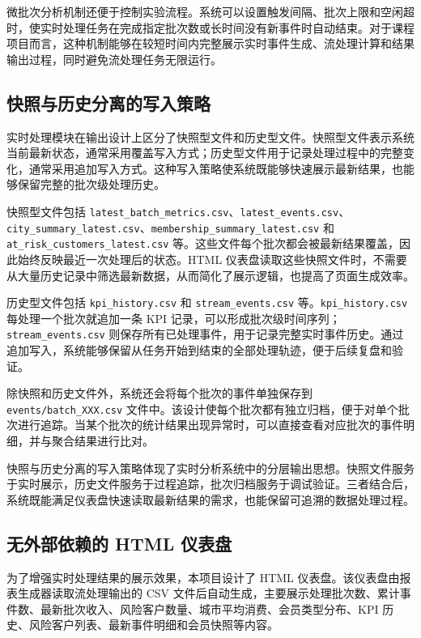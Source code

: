 \documentclass[12pt,hyperref,a4paper,UTF8]{ctexart}
\begin{document}
微批次分析机制还便于控制实验流程。系统可以设置触发间隔、批次上限和空闲超时，使实时处理任务在完成指定批次数或长时间没有新事件时自动结束。对于课程项目而言，这种机制能够在较短时间内完整展示实时事件生成、流处理计算和结果输出过程，同时避免流处理任务无限运行。

\subsection{快照与历史分离的写入策略}

实时处理模块在输出设计上区分了快照型文件和历史型文件。快照型文件表示系统当前最新状态，通常采用覆盖写入方式；历史型文件用于记录处理过程中的完整变化，通常采用追加写入方式。这种写入策略使系统既能够快速展示最新结果，也能够保留完整的批次级处理历史。

快照型文件包括 \texttt{latest\_batch\_metrics.csv}、\texttt{latest\_events.csv}、\texttt{city\_summary\_latest.csv}、\texttt{membership\_summary\_latest.csv} 和 \texttt{at\_risk\_customers\_latest.csv} 等。这些文件每个批次都会被最新结果覆盖，因此始终反映最近一次处理后的状态。HTML 仪表盘读取这些快照文件时，不需要从大量历史记录中筛选最新数据，从而简化了展示逻辑，也提高了页面生成效率。

历史型文件包括 \texttt{kpi\_history.csv} 和 \texttt{stream\_events.csv} 等。\texttt{kpi\_history.csv} 每处理一个批次就追加一条 KPI 记录，可以形成批次级时间序列；\texttt{stream\_events.csv} 则保存所有已处理事件，用于记录完整实时事件历史。通过追加写入，系统能够保留从任务开始到结束的全部处理轨迹，便于后续复盘和验证。

除快照和历史文件外，系统还会将每个批次的事件单独保存到 \texttt{events/batch\_XXX.csv} 文件中。该设计使每个批次都有独立归档，便于对单个批次进行追踪。当某个批次的统计结果出现异常时，可以直接查看对应批次的事件明细，并与聚合结果进行比对。

快照与历史分离的写入策略体现了实时分析系统中的分层输出思想。快照文件服务于实时展示，历史文件服务于过程追踪，批次归档服务于调试验证。三者结合后，系统既能满足仪表盘快速读取最新结果的需求，也能保留可追溯的数据处理过程。

\subsection{无外部依赖的 HTML 仪表盘}

为了增强实时处理结果的展示效果，本项目设计了 HTML 仪表盘。该仪表盘由报表生成器读取流处理输出的 CSV 文件后自动生成，主要展示处理批次数、累计事件数、最新批次收入、风险客户数量、城市平均消费、会员类型分布、KPI 历史、风险客户列表、最新事件明细和会员快照等内容。
\end{document}
